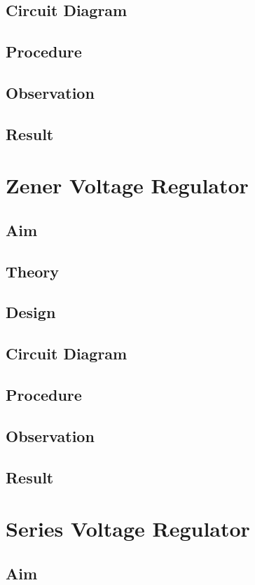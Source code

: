 \documentclass{book}
\begin{document}
\section*{Circuit Diagram}
\section*{Procedure}
\section*{Observation}
\section*{Result}
\chapter[Zener Voltage Regulator]{Zener Voltage Regulator}
\section*{Aim}
\section*{Theory}
\section*{Design}
\section*{Circuit Diagram}
\section*{Procedure}
\section*{Observation}
\section*{Result}
\chapter[Series Voltage Regulator]{Series Voltage Regulator}
\section*{Aim}
\end{document}
